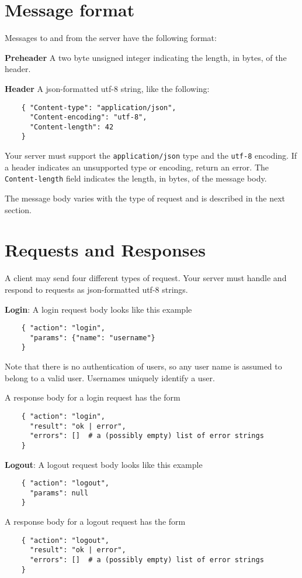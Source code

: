 \documentclass{article}
\begin{document}
\section{Message format}
Messages to and from the server have the following format:

\textbf{Preheader} A two byte unsigned integer indicating the length, in bytes, of the header.

\textbf{Header} A json-formatted utf-8 string, like the following:
\begin{verbatim}
    { "Content-type": "application/json",
      "Content-encoding": "utf-8",
      "Content-length": 42
    }
\end{verbatim}

Your server must support the \texttt{application/json} type and the \texttt{utf-8} encoding. If a header 
indicates an unsupported type or encoding, return an error. The \texttt{Content-length} field indicates the
length, in bytes, of the message body.

The message body varies with the type of request and is described in the next section.

\section{Requests and Responses}
A client may send four different types of request. Your server must handle and respond to 
requests as json-formatted utf-8 strings.

\textbf{Login}: A login request body looks like this example
\begin{verbatim}
    { "action": "login",
      "params": {"name": "username"}
    }
\end{verbatim}          
Note that there is no authentication of users, so any user name is assumed to belong to a valid user. Usernames uniquely identify a user.

A response body for a login request has the form
\begin{verbatim}
    { "action": "login",
      "result": "ok | error",
      "errors": []  # a (possibly empty) list of error strings
    } 
\end{verbatim}

\textbf{Logout}: A logout request body looks like this example
\begin{verbatim}
    { "action": "logout",
      "params": null
    }
\end{verbatim}          

A response body for a logout request has the form
\begin{verbatim}
    { "action": "logout",
      "result": "ok | error",
      "errors": []  # a (possibly empty) list of error strings
    } 
\end{verbatim}
\end{document}
